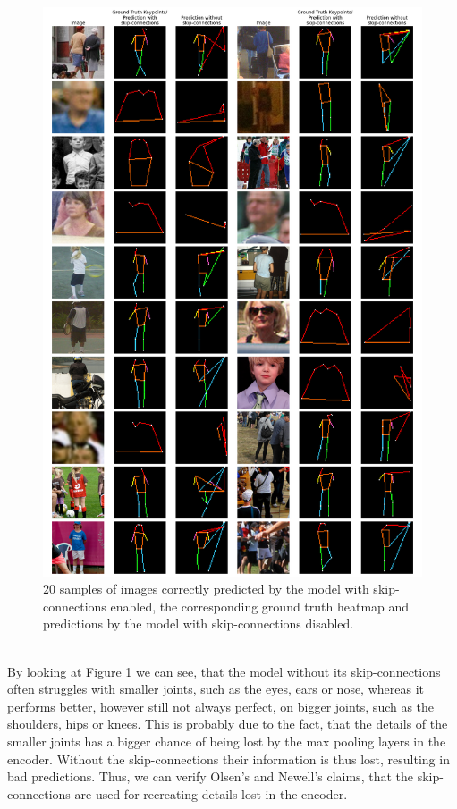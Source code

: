 \documentclass[./main.tex]{subfiles}
\begin{document}
\begin{figure}[htbp]
    \centering
    \includegraphics[width = \textwidth]{entities/pred_comparisons.png}
    \caption{$20$ samples of images correctly predicted by the model with skip-connections enabled, the corresponding ground truth heatmap and predictions by the model with skip-connections disabled.}
    \label{fig:pred_comparison}
\end{figure}
\\
By looking at Figure \ref{fig:pred_comparison} we can see, that the model without its skip-connections often struggles with smaller joints, such as the eyes, ears or nose, whereas it performs better, however still not always perfect, on bigger joints, such as the shoulders, hips or knees. This is probably due to the fact, that the details of the smaller joints has a bigger chance of being lost by the max pooling layers in the encoder. Without the skip-connections their information is thus lost, resulting in bad predictions. Thus, we can verify Olsen's \cite{Camilla} and Newell's \cite{Newell} claims, that the skip-connections are used for recreating details lost in the encoder. 
\end{document}
